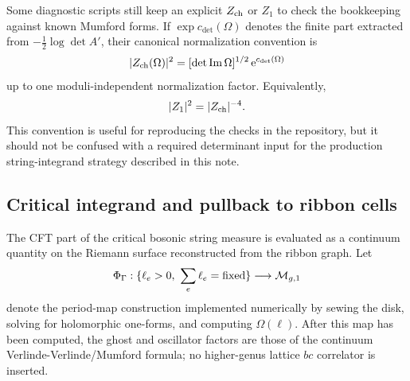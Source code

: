 \documentclass[11pt]{article}
\numberwithin{equation}{section}
\newcommand{\cM}{\mathcal M}
\newcommand{\ee}{\mathrm e}
\newcommand{\im}{\operatorname{Im}}
\begin{document}
Some diagnostic scripts still keep an explicit \(Z_{\rm ch}\) or \(Z_1\) to
check the bookkeeping against known Mumford forms.  If \(\exp c_{\det}(\Omega)\)
denotes the finite part extracted from \(-\frac12\log\det A'\), their canonical
normalization convention is
\begin{equation}
        |Z_{\rm ch}(\Omega)|^2
        =
        [\det\im\Omega]^{1/2}\,\ee^{c_{\det}(\Omega)}
        \label{eq:zch}
\end{equation}
up to one moduli-independent normalization factor.  Equivalently,
\[
        |Z_1|^2=|Z_{\rm ch}|^{-4}.
\]
This convention is useful for reproducing the checks in the repository, but it
should not be confused with a required determinant input for the production
string-integrand strategy described in this note.

\subsection{Critical integrand and pullback to ribbon cells}

The CFT part of the critical bosonic string measure is evaluated as a continuum
quantity on the Riemann surface reconstructed from the ribbon graph.  Let
\[
        \Phi_\Gamma:\{\ell_e>0,\ \sum_e\ell_e={\rm fixed}\}\longrightarrow
        \cM_{g,1}
\]
denote the period-map construction implemented numerically by sewing the disk,
solving for holomorphic one-forms, and computing \(\Omega(\ell)\).  After this
map has been computed, the ghost and oscillator factors are those of the
continuum Verlinde-Verlinde/Mumford formula; no higher-genus lattice \(bc\)
correlator is inserted.
\end{document}

